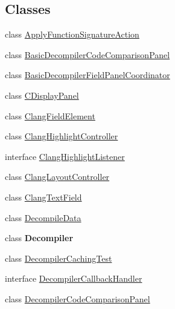 \subsection*{Classes}
\begin{DoxyCompactItemize}
\item 
class \mbox{\hyperlink{classghidra_1_1app_1_1decompiler_1_1component_1_1_apply_function_signature_action}{Apply\+Function\+Signature\+Action}}
\item 
class \mbox{\hyperlink{classghidra_1_1app_1_1decompiler_1_1component_1_1_basic_decompiler_code_comparison_panel}{Basic\+Decompiler\+Code\+Comparison\+Panel}}
\item 
class \mbox{\hyperlink{classghidra_1_1app_1_1decompiler_1_1component_1_1_basic_decompiler_field_panel_coordinator}{Basic\+Decompiler\+Field\+Panel\+Coordinator}}
\item 
class \mbox{\hyperlink{classghidra_1_1app_1_1decompiler_1_1component_1_1_c_display_panel}{C\+Display\+Panel}}
\item 
class \mbox{\hyperlink{classghidra_1_1app_1_1decompiler_1_1component_1_1_clang_field_element}{Clang\+Field\+Element}}
\item 
class \mbox{\hyperlink{classghidra_1_1app_1_1decompiler_1_1component_1_1_clang_highlight_controller}{Clang\+Highlight\+Controller}}
\item 
interface \mbox{\hyperlink{interfaceghidra_1_1app_1_1decompiler_1_1component_1_1_clang_highlight_listener}{Clang\+Highlight\+Listener}}
\item 
class \mbox{\hyperlink{classghidra_1_1app_1_1decompiler_1_1component_1_1_clang_layout_controller}{Clang\+Layout\+Controller}}
\item 
class \mbox{\hyperlink{classghidra_1_1app_1_1decompiler_1_1component_1_1_clang_text_field}{Clang\+Text\+Field}}
\item 
class \mbox{\hyperlink{classghidra_1_1app_1_1decompiler_1_1component_1_1_decompile_data}{Decompile\+Data}}
\item 
class {\bfseries Decompiler}
\item 
class \mbox{\hyperlink{classghidra_1_1app_1_1decompiler_1_1component_1_1_decompiler_caching_test}{Decompiler\+Caching\+Test}}
\item 
interface \mbox{\hyperlink{interfaceghidra_1_1app_1_1decompiler_1_1component_1_1_decompiler_callback_handler}{Decompiler\+Callback\+Handler}}
\item 
class \mbox{\hyperlink{classghidra_1_1app_1_1decompiler_1_1component_1_1_decompiler_code_comparison_panel}{Decompiler\+Code\+Comparison\+Panel}}

\end{DoxyCompactItemize}
